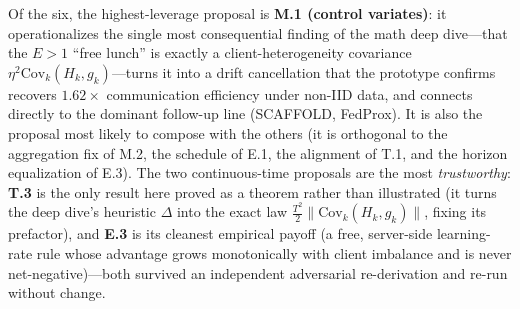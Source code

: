 \documentclass[11pt]{article}
\begin{document}
Of the six, the highest-leverage proposal is \textbf{M.1 (control variates)}: it operationalizes the single most consequential finding of the math deep dive---that the $E>1$ ``free lunch'' is exactly a client-heterogeneity covariance $\eta^2\mathrm{Cov}_k(H_k,g_k)$---turns it into a drift cancellation that the prototype confirms recovers $1.62\times$ communication efficiency under non-IID data, and connects directly to the dominant follow-up line (SCAFFOLD, FedProx). It is also the proposal most likely to compose with the others (it is orthogonal to the aggregation fix of M.2, the schedule of E.1, the alignment of T.1, and the horizon equalization of E.3). The two continuous-time proposals are the most \emph{trustworthy}: \textbf{T.3} is the only result here proved as a theorem rather than illustrated (it turns the deep dive's heuristic $\Delta$ into the exact law $\tfrac{T^2}{2}\lVert\mathrm{Cov}_k(H_k,g_k)\rVert$, fixing its prefactor), and \textbf{E.3} is its cleanest empirical payoff (a free, server-side learning-rate rule whose advantage grows monotonically with client imbalance and is never net-negative)---both survived an independent adversarial re-derivation and re-run without change.



\end{document}
